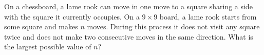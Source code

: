 On a chessboard, a lame rook can move in one move to a square sharing a side with the square it currently occupies. On a $9\times9$ board, a lame rook starts from some square and makes $n$ moves. During this process it does not visit any square twice and does not make two consecutive moves in the same direction. What is the largest possible value of $n$?
